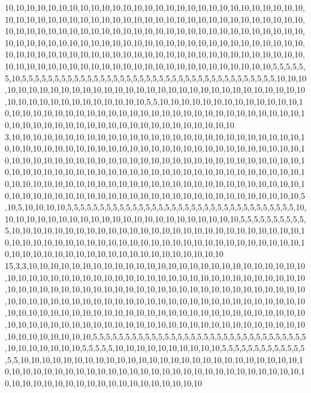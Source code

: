 10,10,10,10,10,10,10,10,10,10,10,10,10,10,10,10,10,10,10,10,10,10,10,10,10,10,10,10,10,10,10,10,10,10,10,10,10,10,10,10,10,10,10,10,10,10,10,10,10,10,10,10,10,10,10,10,10,10,10,10,10,10,10,10,10,10,10,10,10,10,10,10,10,10,10,10,10,10,10,10,10,10,10,10,10,10,10,10,10,10,10,10,10,10,10,10,10,10,10,10,10,10,10,10,10,10,10,10,10,10,10,10,10,10,10,10,10,10,10,10,10,10,10,10,10,10,10,10,10,10,10,10,10,10,10,10,10,10,10,10,10,10,10,10,10,10,10,10,10,10,10,10,10,10,10,10,10,10,10,10,10,10,10,10,10,5,5,5,5,5,5,10,5,5,5,5,5,5,5,5,5,5,5,5,5,5,5,5,5,5,5,5,5,5,5,5,5,5,5,5,5,5,5,5,5,5,5,5,5,5,5,10,10,10,10,10,10,10,10,10,10,10,10,10,10,10,10,10,10,10,10,10,10,10,10,10,10,10,10,10,10,10,10,10,10,10,10,10,10,10,10,10,10,10,10,5,5,10,10,10,10,10,10,10,10,10,10,10,10,10,10,10,10,10,10,10,10,10,10,10,10,10,10,10,10,10,10,10,10,10,10,10,10,10,10,10,10,10,10,10,10,10,10,10,10,10,10,10,10,10,10,10,10,10,10,10,10,10,10,10
3,10,10,10,10,10,10,10,10,10,10,10,10,10,10,10,10,10,10,10,10,10,10,10,10,10,10,10,10,10,10,10,10,10,10,10,10,10,10,10,10,10,10,10,10,10,10,10,10,10,10,10,10,10,10,10,10,10,10,10,10,10,10,10,10,10,10,10,10,10,10,10,10,10,10,10,10,10,10,10,10,10,10,10,10,10,10,10,10,10,10,10,10,10,10,10,10,10,10,10,10,10,10,10,10,10,10,10,10,10,10,10,10,10,10,10,10,10,10,10,10,10,10,10,10,10,10,10,10,10,10,10,10,10,10,10,10,10,10,10,10,10,10,10,10,10,10,10,10,10,10,10,10,10,10,10,10,10,10,10,10,10,10,10,10,10,10,10,5,10,5,10,10,10,10,5,5,5,5,5,5,5,5,5,5,5,5,5,5,5,5,5,5,5,5,5,5,5,5,5,5,5,5,5,5,5,5,5,5,5,10,10,10,10,10,10,10,10,10,10,10,10,10,10,10,10,10,10,10,10,10,10,10,5,5,5,5,5,5,5,5,5,5,5,10,10,10,10,10,10,10,10,10,10,10,10,10,10,10,10,10,10,10,10,10,10,10,10,10,10,10,10,10,10,10,10,10,10,10,10,10,10,10,10,10,10,10,10,10,10,10,10,10,10,10,10,10,10,10,10,10,10,10,10,10,10,10,10,10,10,10,10,10,10,10,10,10,10,10,10
15,3,3,10,10,10,10,10,10,10,10,10,10,10,10,10,10,10,10,10,10,10,10,10,10,10,10,10,10,10,10,10,10,10,10,10,10,10,10,10,10,10,10,10,10,10,10,10,10,10,10,10,10,10,10,10,10,10,10,10,10,10,10,10,10,10,10,10,10,10,10,10,10,10,10,10,10,10,10,10,10,10,10,10,10,10,10,10,10,10,10,10,10,10,10,10,10,10,10,10,10,10,10,10,10,10,10,10,10,10,10,10,10,10,10,10,10,10,10,10,10,10,10,10,10,10,10,10,10,10,10,10,10,10,10,10,10,10,10,10,10,10,10,10,10,10,10,10,10,10,10,10,10,10,10,10,10,10,10,10,10,10,10,10,10,10,10,10,10,10,10,10,10,10,10,10,10,5,5,5,5,5,5,5,5,5,5,5,5,5,5,5,5,5,5,5,5,5,5,5,5,5,5,5,5,5,5,5,5,5,10,10,10,10,10,10,10,5,5,5,5,5,10,10,10,10,10,10,10,10,10,10,5,5,5,5,5,5,5,5,5,5,5,5,5,5,5,10,10,10,10,10,10,10,10,10,10,10,10,10,10,10,10,10,10,10,10,10,10,10,10,10,10,10,10,10,10,10,10,10,10,10,10,10,10,10,10,10,10,10,10,10,10,10,10,10,10,10,10,10,10,10,10,10,10,10,10,10,10,10,10,10,10,10,10,10,10,10,10,10
